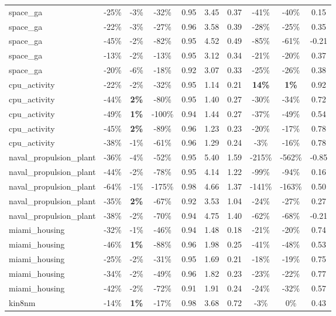 \begin{table}[!htbp]
\begin{small}
\begin{sc}
{\begin{tabular}{lccccccccc}
space\_ga & -25\% & -3\% & -32\% & 0.95 & 3.45 & 0.37 & -41\% & -40\% & 0.15 \\
space\_ga & -22\% & -3\% & -27\% & 0.96 & 3.58 & 0.39 & -28\% & -25\% & 0.35 \\
space\_ga & -45\% & -2\% & -82\% & 0.95 & 4.52 & 0.49 & -85\% & -61\% & -0.21 \\
space\_ga & -13\% & -2\% & -13\% & 0.95 & 3.12 & 0.34 & -21\% & -20\% & 0.37 \\
space\_ga & -20\% & -6\% & -18\% & 0.92 & 3.07 & 0.33 & -25\% & -26\% & 0.38 \\
cpu\_activity & -22\% & -2\% & -32\% & 0.95 & 1.14 & 0.21 & \textbf{14\%} & \textbf{1\%} & 0.92 \\
cpu\_activity & -44\% & \textbf{2\%} & -80\% & 0.95 & 1.40 & 0.27 & -30\% & -34\% & 0.72 \\
cpu\_activity & -49\% & \textbf{1\%} & -100\% & 0.94 & 1.44 & 0.27 & -37\% & -49\% & 0.54 \\
cpu\_activity & -45\% & \textbf{2\%} & -89\% & 0.96 & 1.23 & 0.23 & -20\% & -17\% & 0.78 \\
cpu\_activity & -38\% & -1\% & -61\% & 0.96 & 1.29 & 0.24 & -3\% & -16\% & 0.78 \\
naval\_propulsion\_plant & -36\% & -4\% & -52\% & 0.95 & 5.40 & 1.59 & -215\% & -562\% & -0.85 \\
naval\_propulsion\_plant & -44\% & -2\% & -78\% & 0.95 & 4.14 & 1.22 & -99\% & -94\% & 0.16 \\
naval\_propulsion\_plant & -64\% & -1\% & -175\% & 0.98 & 4.66 & 1.37 & -141\% & -163\% & 0.50 \\
naval\_propulsion\_plant & -35\% & \textbf{2\%} & -67\% & 0.92 & 3.53 & 1.04 & -24\% & -27\% & 0.27 \\
naval\_propulsion\_plant & -38\% & -2\% & -70\% & 0.94 & 4.75 & 1.40 & -62\% & -68\% & -0.21 \\
miami\_housing & -32\% & -1\% & -46\% & 0.94 & 1.48 & 0.18 & -21\% & -20\% & 0.74 \\
miami\_housing & -46\% & \textbf{1\%} & -88\% & 0.96 & 1.98 & 0.25 & -41\% & -48\% & 0.53 \\
miami\_housing & -25\% & -2\% & -31\% & 0.95 & 1.69 & 0.21 & -18\% & -19\% & 0.75 \\
miami\_housing & -34\% & -2\% & -49\% & 0.96 & 1.82 & 0.23 & -23\% & -22\% & 0.77 \\
miami\_housing & -42\% & -2\% & -72\% & 0.91 & 1.91 & 0.24 & -24\% & -32\% & 0.57 \\
kin8nm & -14\% & \textbf{1\%} & -17\% & 0.98 & 3.68 & 0.72 & -3\% & 0\% & 0.43 \\

\end{tabular}}
\end{sc}
\end{small}
\end{table}
